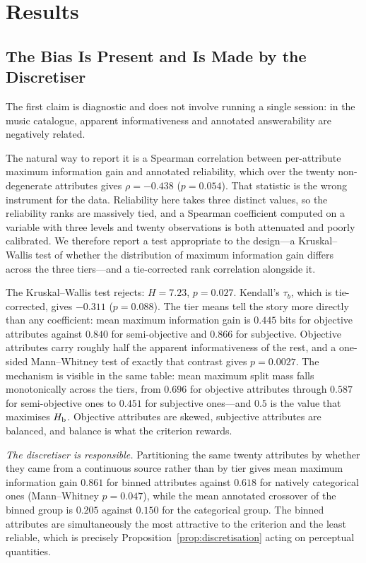\section{Results}
\label{sec:results}

\subsection{The Bias Is Present and Is Made by the Discretiser}
\label{sec:results-bias}

The first claim is diagnostic and does not involve running a single session:
in the music catalogue, apparent informativeness and annotated answerability
are negatively related.

The natural way to report it is a Spearman correlation between per-attribute
maximum information gain and annotated reliability, which over the twenty
non-degenerate attributes gives $\rho = -0.438$ ($p = 0.054$). That statistic
is the wrong instrument for the data. Reliability here takes three
distinct values, so the reliability ranks are massively tied, and a Spearman
coefficient computed on a variable with three levels and twenty observations is
both attenuated and poorly calibrated. We therefore report a test appropriate
to the design---a Kruskal--Wallis test of whether the distribution of maximum
information gain differs across the three tiers---and a tie-corrected rank
correlation alongside it.

The Kruskal--Wallis test rejects: $H = 7.23$, $p = 0.027$. Kendall's $\tau_b$,
which is tie-corrected, gives $-0.311$ ($p = 0.088$). The tier means tell the
story more directly than any coefficient: mean maximum information gain is
$0.445$ bits for objective attributes against $0.840$ for semi-objective and
$0.866$ for subjective. Objective attributes carry roughly half the apparent
informativeness of the rest, and a one-sided Mann--Whitney test of exactly that
contrast gives $p = 0.0027$. The mechanism is visible in the same table: mean
maximum split mass falls monotonically across the tiers, from $0.696$ for
objective attributes through $0.587$ for semi-objective ones to $0.451$ for
subjective ones---and $0.5$ is the value that maximises $H_{\mathrm{b}}$. Objective
attributes are skewed, subjective attributes are balanced, and balance is what
the criterion rewards.

\emph{The discretiser is responsible.} Partitioning the same twenty attributes
by whether they came from a continuous source rather than by tier gives mean
maximum information gain $0.861$ for binned attributes against $0.618$ for
natively categorical ones (Mann--Whitney $p = 0.047$), while the mean annotated
crossover of the binned group is $0.205$ against $0.150$ for the categorical
group. The binned attributes are simultaneously the most attractive to the
criterion and the least reliable, which is precisely
Proposition~\ref{prop:discretisation} acting on perceptual quantities.

